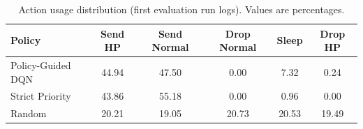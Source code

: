\begin{table}[t]
\centering
\caption{Action usage distribution (first evaluation run logs). Values are percentages.}
\label{tab:action_mix}
\scriptsize
\begin{tabular}{lccccc}
\toprule
Policy & Send HP & Send Normal & Drop Normal & Sleep & Drop HP \\
\midrule
Policy-Guided DQN & 44.94 & 47.50 & 0.00 & 7.32 & 0.24 \\
Strict Priority & 43.86 & 55.18 & 0.00 & 0.96 & 0.00 \\
Random & 20.21 & 19.05 & 20.73 & 20.53 & 19.49 \\
\bottomrule
\end{tabular}
\end{table}
